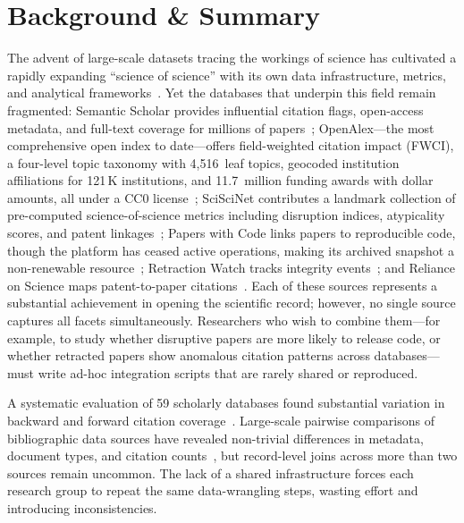 \section{Background \& Summary}
\label{sec:background}

The advent of large-scale datasets tracing the workings of science has cultivated
a rapidly expanding ``science of science'' with its own data infrastructure,
metrics, and analytical frameworks~\cite{liu2023science}. Yet the databases that
underpin this field remain fragmented: Semantic Scholar provides influential
citation flags, open-access metadata, and full-text coverage for millions of
papers~\cite{kinney2023s2ag}; OpenAlex---the most comprehensive open index to
date---offers field-weighted citation impact (FWCI), a four-level topic taxonomy
with 4,516~leaf topics, geocoded institution affiliations for 121\,K
institutions, and 11.7~million funding awards with dollar amounts, all under a
CC0 license~\cite{priem2022openalex}; SciSciNet contributes a landmark
collection of pre-computed science-of-science metrics including disruption
indices, atypicality scores, and patent linkages~\cite{lin2023sciscinet}; Papers
with Code links papers to reproducible code, though the platform has ceased
active operations, making its archived snapshot a non-renewable
resource~\cite{paperswithcode2024}; Retraction Watch tracks integrity
events~\cite{retractionwatch2024}; and Reliance on Science maps patent-to-paper
citations~\cite{marx2020ros}. Each of these sources represents a substantial
achievement in opening the scientific record; however, no single source captures
all facets simultaneously. Researchers who wish to combine them---for example, to
study whether disruptive papers are more likely to release code, or whether
retracted papers show anomalous citation patterns across databases---must write
ad-hoc integration scripts that are rarely shared or reproduced.

A systematic evaluation of 59 scholarly databases found substantial variation in
backward and forward citation coverage~\cite{gusenbauer2024citation}. Large-scale
pairwise comparisons of bibliographic data sources have revealed non-trivial
differences in metadata, document types, and citation
counts~\cite{visser2021comparison}, but record-level joins across more than two
sources remain uncommon. The lack of a shared infrastructure forces each research
group to repeat the same data-wrangling steps, wasting effort and introducing
inconsistencies.

